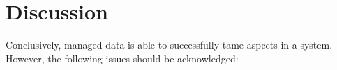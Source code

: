 


\section{Discussion}\label{Evaluation Discussion}
Conclusively, managed data is able to successfully tame aspects in a system.
However, the following issues should be acknowledged:

